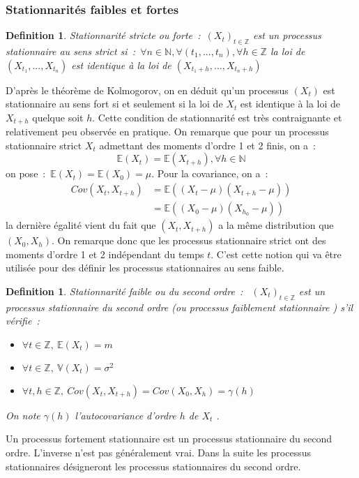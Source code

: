 \documentclass[11pt]{scrartcl} %
\newtheorem{Def}[theorem]{Definition}
\begin{document}
\subsubsection{Stationnarités faibles et fortes}
\begin{Def}\label{staForte}
Stationnarité stricte ou forte~:~$\left(X_t\right)_{t\in\mathbb{Z}}$ est un processus stationnaire au sens strict si~:~$\forall n\in \mathbb{N}, \forall (t_1,...,t_n), \forall h\in\mathbb{Z}$ la loi de $(X_{t_1},...,X_{t_n})$ est identique à la loi de $(X_{t_1+h},...,X_{t_n+h})$
\end{Def}
D'après le théorème de Kolmogorov, on en déduit qu'un processus $\left(X_t\right)$ est stationnaire au sens fort si et seulement si la loi de $X_t$ est identique à la loi de $X_{t+h}$ quelque soit $h$. Cette condition de stationnarité est très contraignante et relativement peu observée en pratique. On remarque que pour un processus stationnaire strict $X_t$ admettant des moments d'ordre 1 et 2 finis, on a~:
$$
\mathbb{E}\left(X_t\right)=\mathbb{E}\left(X_{t+h}\right), \forall h\in \mathbb{N}
$$
on pose~:~$\mathbb{E}\left(X_t\right)=\mathbb{E}\left(X_0\right)=\mu$. Pour la covariance, on a~:
\begin{align*}
Cov\left(X_t,X_{t+h}\right)& = \mathbb{E}\left((X_t-\mu)(X_{t+h}-\mu)\right)\\
&= \mathbb{E}\left((X_0-\mu)(X_{h_0}-\mu)\right)
\end{align*}
la dernière égalité vient du fait que $(X_t,X_{t+h})$ a la même distribution que $(X_0,X_h)$.
On remarque donc que les processus stationnaire strict ont des moments d'ordre 1 et 2 indépendant du temps $t$. C'est cette notion qui va être utilisée pour des définir les processus stationnaires au sens faible.
\begin{Def}\label{staFaible}
Stationnarité faible ou du second ordre~:~
$\left(X_t\right)_{t\in\mathbb{Z}}$ est un processus stationnaire du second ordre (ou processus faiblement stationnaire ) s'il vérifie~:
\begin{itemize}
\item[i)]$\forall t\in\mathbb{Z},~\mathbb{E}\left(X_t\right)=m $ 
\item[ii)]$\forall t\in\mathbb{Z},~\mathbb{V}\left(X_t\right)=\sigma^2 $ 
\item[iii)]$\forall t,h\in\mathbb{Z},~Cov\left(X_t,X_{t+h}\right)=Cov\left(X_0,X_h\right)=\gamma\left(h\right) $ 
\end{itemize}
On note $\gamma(h)$ l'autocovariance d'ordre $h$ de $X_t$ .
\end{Def} 
Un processus fortement stationnaire est un processus stationnaire du second ordre. L'inverse n'est pas généralement vrai. Dans la suite les processus stationnaires désigneront les processus stationnaires du second ordre.
\end{document}
